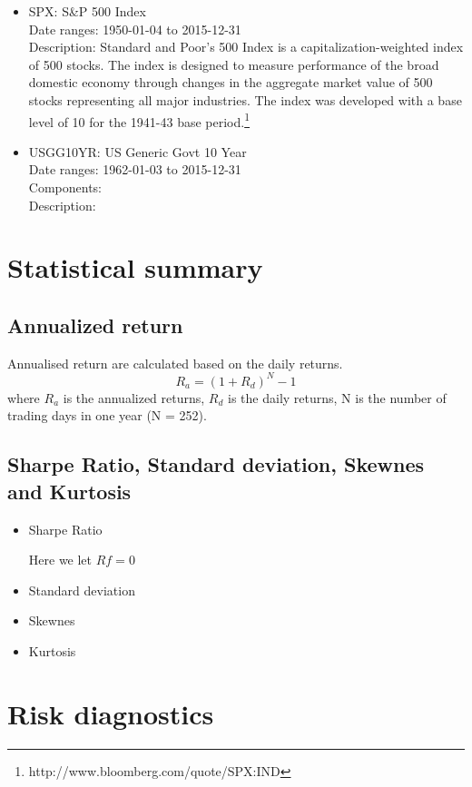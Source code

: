 \documentclass[12pt]{article}
\begin{document}
\begin{itemize}
\item SPX: S\&P 500 Index\\
Date ranges: 1950-01-04 to 2015-12-31 \\
Description: Standard and Poor's 500 Index is a capitalization-weighted index of 500 stocks. The index is designed to measure performance of the broad domestic economy through changes in the aggregate market value of 500 stocks representing all major industries. The index was developed with a base level of 10 for the 1941-43 base period.\footnote{http://www.bloomberg.com/quote/SPX:IND}
\item USGG10YR: US Generic Govt 10 Year\\
Date ranges: 1962-01-03 to 2015-12-31 \\
Components: \\
Description: 
\end{itemize}


\section{Statistical summary}

\subsection{Annualized return}

Annualised return are calculated based on the daily returns. 
\begin{equation}
R_a = (1+R_d)^{N} -1
\end{equation}
where $R_a$ is the annualized returns, $R_d$ is the daily returns, N is the number of trading days in one year (N = 252).

\subsection{Sharpe Ratio, Standard deviation, Skewnes and Kurtosis}

\begin{itemize}
\item Sharpe Ratio

Here we let $Rf = 0$
\item Standard deviation
\item Skewnes
\item Kurtosis
\end{itemize}




\section{Risk diagnostics}
\end{document}
